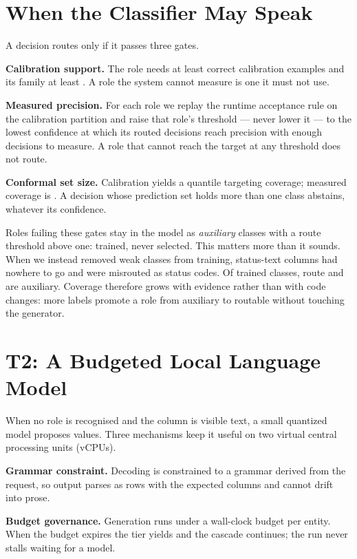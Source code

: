 \documentclass[journal]{IEEEtran}
\begin{document}
\section{When the Classifier May Speak}
\label{sec:routing}

A decision routes only if it passes three gates.

\textbf{Calibration support.} The role needs at least \RoleFloor{}
correct calibration examples and its family at least \FamilyFloor{}. A
role the system cannot measure is one it must not use.

\textbf{Measured precision.} For each role we replay the runtime
acceptance rule on the calibration partition and raise that role's
threshold --- never lower it --- to the lowest confidence at which its
routed decisions reach \PrecisionTarget{} precision with enough
decisions to measure. A role that cannot reach the target at any
threshold does not route.

\textbf{Conformal set size.} Calibration yields a quantile targeting
\ConformalCoverage{} coverage; measured coverage is
\ConformalCoverage{}. A decision whose prediction set holds more than
one class abstains, whatever its confidence.

Roles failing these gates stay in the model as \emph{auxiliary} classes
with a route threshold above one: trained, never selected. This matters
more than it sounds. When we instead removed weak classes from training,
status-text columns had nowhere to go and were misrouted as status
codes. Of \TrainedClasses{} trained classes, \RoutableRoles{} route and
\AuxiliaryRoles{} are auxiliary. Coverage therefore grows with evidence
rather than with code changes: more labels promote a role from auxiliary
to routable without touching the generator.

\section{T2: A Budgeted Local Language Model}
\label{sec:t2}

When no role is recognised and the column is visible text, a small
quantized model proposes values. Three mechanisms keep it useful on two
virtual central processing units (vCPUs).

\textbf{Grammar constraint.} Decoding is constrained to a grammar
derived from the request, so output parses as rows with the expected
columns and cannot drift into prose.

\textbf{Budget governance.} Generation runs under a wall-clock budget
per entity. When the budget expires the tier yields and the cascade
continues; the run never stalls waiting for a model.
\end{document}
